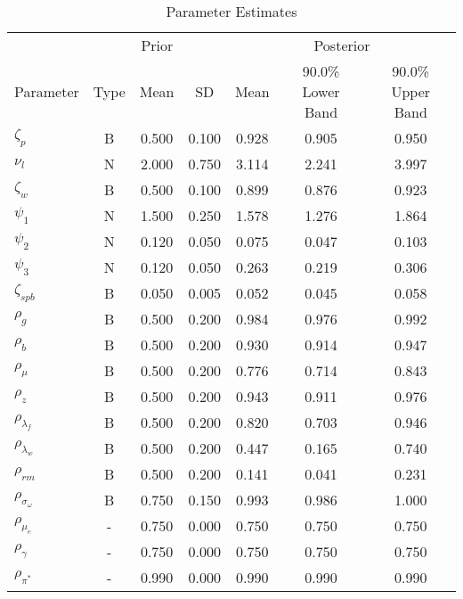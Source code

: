 \documentclass[12pt]{article}
\begin{document}
\pagestyle{empty}
\begin{table}[h]
\centering
\caption{Parameter Estimates}
\vspace*{.5cm}
{\small 
\begin{tabular}{lcccccc}
\hline
\multicolumn{1}{c}{} & \multicolumn{3}{c}{Prior} & \multicolumn{3}{c}{Posterior}\\ 
Parameter & Type & Mean & SD & Mean & 90.0\% {\tiny Lower Band} & 90.0\% {\tiny Upper Band}\\ 
\cmidrule(lr){1-1}\cmidrule(lr){2-4}\cmidrule(lr){5-7}
$\zeta_p$ & B &    0.500 &    0.100 &    0.928 &    0.905 &    0.950 \\
$\nu_l$ & N &    2.000 &    0.750 &    3.114 &    2.241 &    3.997 \\
$\zeta_w$ & B &    0.500 &    0.100 &    0.899 &    0.876 &    0.923 \\
$\psi_1$ & N &    1.500 &    0.250 &    1.578 &    1.276 &    1.864 \\
$\psi_2$ & N &    0.120 &    0.050 &    0.075 &    0.047 &    0.103 \\
$\psi_3$ & N &    0.120 &    0.050 &    0.263 &    0.219 &    0.306 \\
$\zeta_{spb}$ & B &    0.050 &    0.005 &    0.052 &    0.045 &    0.058 \\
$\rho_g$ & B &    0.500 &    0.200 &    0.984 &    0.976 &    0.992 \\
$\rho_b$ & B &    0.500 &    0.200 &    0.930 &    0.914 &    0.947 \\
$\rho_{\mu}$ & B &    0.500 &    0.200 &    0.776 &    0.714 &    0.843 \\
$\rho_z$ & B &    0.500 &    0.200 &    0.943 &    0.911 &    0.976 \\
$\rho_{\lambda_f}$ & B &    0.500 &    0.200 &    0.820 &    0.703 &    0.946 \\
$\rho_{\lambda_w}$ & B &    0.500 &    0.200 &    0.447 &    0.165 &    0.740 \\
$\rho_{rm}$ & B &    0.500 &    0.200 &    0.141 &    0.041 &    0.231 \\
$\rho_{\sigma_\omega}$ & B &    0.750 &    0.150 &    0.993 &    0.986 &    1.000 \\
$\rho_{\mu_e}$ & - &    0.750 &    0.000 &    0.750 &    0.750 &    0.750 \\
$\rho_{\gamma}$ & - &    0.750 &    0.000 &    0.750 &    0.750 &    0.750 \\
$\rho_{\pi^*}$ & - &    0.990 &    0.000 &    0.990 &    0.990 &    0.990 \\

\end{tabular}}
\end{table}
\end{document}
